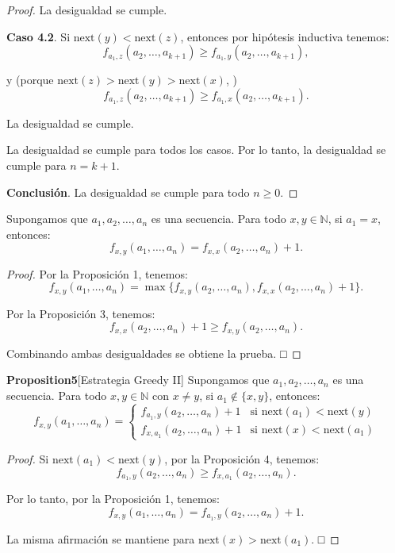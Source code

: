 \documentclass{article}
\begin{document}
\begin{proof}
La desigualdad se cumple.

\textbf{Caso 4.2}. Si $\text{next}(y) < \text{next}(z)$, entonces por hipótesis inductiva tenemos:
$$
f_{a_1,z}(a_2, \ldots, a_{k+1}) \geq f_{a_1,y}(a_2, \ldots, a_{k+1}),
$$

y (porque $\text{next}(z) > \text{next}(y) > \text{next}(x)$, )
$$
f_{a_1,z}(a_2, \ldots, a_{k+1}) \geq f_{a_1,x}(a_2, \ldots, a_{k+1}).
$$

La desigualdad se cumple.

La desigualdad se cumple para todos los casos. Por lo tanto, la desigualdad se cumple para $n=k+1$.

\textbf{Conclusión}. La desigualdad se cumple para todo $n \geq 0$.
\end{proof}

\begin{proposition}
Supongamos que $a_1, a_2, \ldots, a_n$ es una secuencia. Para todo $x, y \in \mathbb{N}$, si $a_1 = x$, entonces:
$$
f_{x,y}(a_1, \ldots, a_n) = f_{x,x}(a_2, \ldots, a_n) + 1.
$$

\end{proposition}

\begin{proof}
Por la Proposición 1, tenemos:
$$
f_{x,y}(a_1, \ldots, a_n) = \max \{f_{x,y}(a_2, \ldots, a_n), f_{x,x}(a_2, \ldots, a_n) + 1\}.
$$

Por la Proposición 3, tenemos:
$$
f_{x,x}(a_2, \ldots, a_n) + 1 \geq f_{x,y}(a_2, \ldots, a_n).
$$

Combinando ambas desigualdades se obtiene la prueba. □
\end{proof}

\textbf{Proposition5}[Estrategia Greedy II]
Supongamos que $a_1, a_2, \ldots, a_n$ es una secuencia. Para todo $x, y \in \mathbb{N}$ con $x \neq y$, si $a_1 \notin \{x, y\}$, entonces:
$$
f_{x,y}(a_1, \ldots, a_n) = \begin{cases}
f_{a_1,y}(a_2, \ldots, a_n) + 1 & \text{si } \text{next}(a_1) < \text{next}(y) \\
f_{x,a_1}(a_2, \ldots, a_n) + 1 & \text{si } \text{next}(x) < \text{next}(a_1)
\end{cases}
$$



\begin{proof}
Si $\text{next}(a_1) < \text{next}(y)$, por la Proposición 4, tenemos:
$$
f_{a_1,y}(a_2, \ldots, a_n) \geq f_{x,a_1}(a_2, \ldots, a_n).
$$

Por lo tanto, por la Proposición 1, tenemos:
$$
f_{x,y}(a_1, \ldots, a_n) = f_{a_1,y}(a_2, \ldots, a_n) + 1.
$$

La misma afirmación se mantiene para $\text{next}(x) > \text{next}(a_1)$. □
\end{proof}
\end{document}

